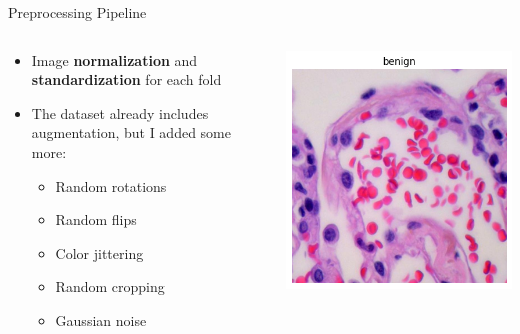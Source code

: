 \documentclass[aspectratio=169,8pt]{beamer}  %
\begin{document}
\begin{frame}{Preprocessing Pipeline}
\begin{columns}[T]
\begin{column}{0.5\textwidth}
\begin{itemize}
\item Image \textbf{normalization} and \textbf{standardization} for each fold
\item The dataset already includes augmentation, but I added some more:
  \begin{itemize}
  \item Random rotations
  \item Random flips
  \item Color jittering
  \item Random cropping
  \item Gaussian noise
  \end{itemize}
\end{itemize}
\end{column}
\begin{column}{0.5\textwidth}
\hfill\includegraphics[width=0.95\linewidth, height=0.45\textheight]{imgs/normal_image.png}
\vspace{0.2cm}

\end{column}
\end{columns}
\end{frame}
\end{document}
